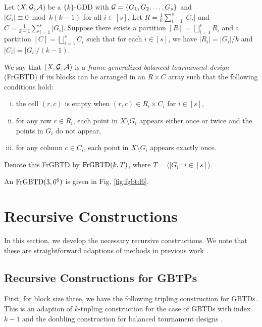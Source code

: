 \documentclass[draft, 11pt]{article}
\begin{document}
 Let $(X,\mathcal G,\mathcal A$) be a $\{k\}$-GDD with $\mathcal G=\{G_1,G_2,\ldots,G_s\}$
 and $|G_i|\equiv 0\bmod k(k-1)$ for all $i\in [s]$. Let
 $R=\frac{1}{k}\sum_{i=1}^s |G_i|$ and $C=\frac{1}{k-1}\sum_{i=1}^s
 |G_i|$. Suppose there exists a partition $[R]=\bigsqcup_{i=1}^s R_i$
 and a partition $[C]=\bigsqcup_{i=1}^s C_i$ such that for each $i\in
 [s]$, we have $|R_i| = |G_i|/k$ and $|C_i|=|G_i|/(k-1)$.

 We say that $(X,\mathcal G,\mathcal A)$ is a
 {\em frame generalized balanced tournament design} (FrGBTD)
 if its blocks can be arranged in an $R\times C$ array
 such that the following conditions hold:
 \begin{enumerate}[(i)]
 \item the cell $(r,c)$ is empty when $(r,c)\in R_i\times C_i$ for $i\in[s]$,
 \item for any row $r\in R_i$, each point in $X\setminus G_i$ appears either once or twice and the
 points in $G_i$ do not appear,
 \item for any column $c\in C_i$, each point in $X\setminus G_i$ appears exactly once.
 \end{enumerate}
 Denote this FrGBTD by ${\rm FrGBTD}(k,T)$, where $T=\langle |G_i| :
 i\in[s] \rangle$.

 \begin{example}
\label{eg:fgbtd6} An ${\rm FrGBTD}(3,6^6)$ is given in Fig.
\ref{fig:fgbtd6}.
\end{example}

 \section{Recursive Constructions}
 \label{sec:recursive}

 In this section, we develop the necessary recursive constructions.
 We note that these are straightforward adaptions of methods in previous work
  \cite{Lamken:1992, Lamken:1994, Yinetal:2008, Daietal:2013}. %

 \subsection{Recursive Constructions for GBTPs}

  First, for block size three, we have the following tripling construction for GBTDs.
  This is an adaption of $k$-tupling construction for the case of GBTDs with index $k-1$ \cite[Theorem 3.1]{Lamken:1994}
  and the doubling construction for balanced tournament designs \cite{Schellenbergetal:1977}.
   
\end{document}
